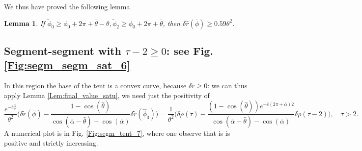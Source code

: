 \documentclass[reqno]{amsart}
\theoremstyle{definition} \newtheorem{definition}{Definition}[section]
\theoremstyle{definition} \newtheorem{remark}[definition]{Remark}
\theoremstyle{plain} \newtheorem{lemma}[definition]{Lemma}
\theoremstyle{plain} \newtheorem{proposition}[definition]{Proposition}
\theoremstyle{plain} \newtheorem{theorem}[definition]{Theorem}
\theoremstyle{plain} \newtheorem{corollary}[definition]{Corollary}
\theoremstyle{definition} \newtheorem{example}[definition]{Example}
\theoremstyle{plain} \newtheorem{claim}[clai]{Claim}
\theoremstyle{definition} \newtheorem{assumption}[definition]{Assumption}
\theoremstyle{definition} \newtheorem{observation}[definition]{Observation}
\newcommand{\1}{\mathbbm 1}
\numberwithin{equation}{section} %
\theoremstyle{plain} \newtheorem*{theorem*}{Theorem}
\theoremstyle{plain} \newtheorem{mthm}[maintheorem]{Main Theorem}
\theoremstyle{plain} \newtheorem*{mthm*}{Main Theorem}
\theoremstyle{plain} \newtheorem*{conjecture*}{Conjecture}
\theoremstyle{plain} \newtheorem{conjecture}[definition]{Conjecture}
\theoremstyle{plain} \newtheorem*{problem*}{Problem}
\begin{document}
We thus have proved the following lemma.

\begin{lemma}
\label{Lem:segm_tent_5}
If $\check \phi_0 \geq \phi_0 + 2\pi + \bar \theta - \theta, \check \phi_2 \geq \phi_0 + 2\pi + \bar \theta$, then $\delta \hat r(\bar \phi) \geq 0.59 \theta^2$.
\end{lemma}


%
%
%
%


\subsection{Segment-segment with \texorpdfstring{$\tau - 2 \geq 0$}{tau - 2 geq 0}: see Fig. \ref{Fig:segm_segm_sat_6}}
\label{Sss:segm_semg_after_neg_6}


In this region the base of the tent is a convex curve, because $\delta \tilde r \geq 0$: we can thus apply Lemma \ref{Lem:final_value_satu}, we need just the positivity of
\begin{equation}
\label{Equa:rho_7_segm_segm}
\frac{e^{-\bar c \bar \phi}}{\theta^2} \bigg( \delta \tilde r(\bar \phi) - \frac{1 - \cos(\hat \theta)}{\cos(\bar \alpha - \hat \theta) - \cos(\bar \alpha)} \delta \tilde r(\hat \phi_0) \bigg) = \frac{1}{\theta^2} \bigg( \delta \rho(\bar \tau) - \frac{(1 - \cos(\hat \theta)) e^{- \bar c (2\pi + \bar \alpha) 2}}{\cos(\bar \alpha - \hat \theta) - \cos(\bar \alpha)} \delta \rho(\bar \tau - 2) \bigg), \quad \bar \tau > 2.
\end{equation}
A numerical plot is in Fig. \ref{Fig:segm_tent_7}, where one observe that is is positive and strictly increasing.
\end{document}
